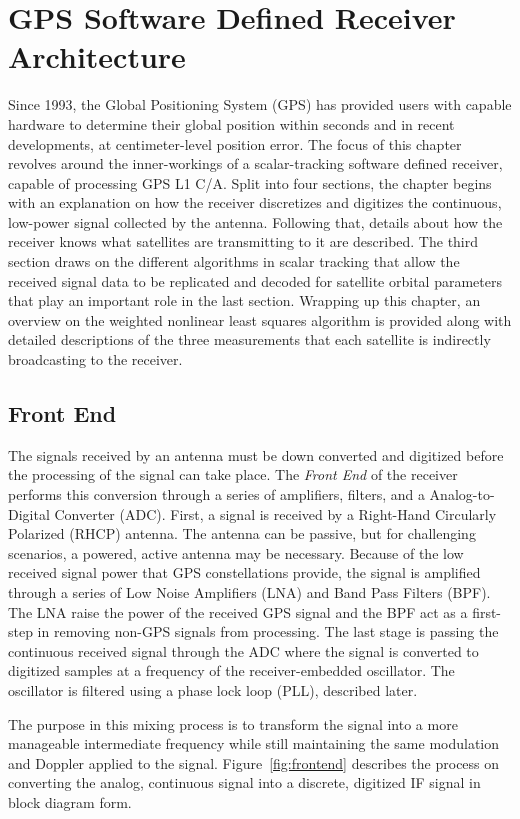 \chapter{GPS Software Defined Receiver Architecture}\label{chpater:scalartracking}
Since 1993, the Global Positioning System (GPS) has provided users with capable hardware to determine their global position within seconds and in recent developments, at centimeter-level position error. The focus of this chapter revolves around the inner-workings of a scalar-tracking software defined receiver, capable of processing GPS L1 C/A. Split into four sections, the chapter begins with an explanation on how the receiver discretizes and digitizes the continuous, low-power signal collected by the antenna. Following that, details about how the receiver knows what satellites are transmitting to it are described. The third section draws on the different algorithms in scalar tracking that allow the received signal data to be replicated and decoded for satellite orbital parameters that play an important role in the last section. Wrapping up this chapter, an overview on the weighted nonlinear least squares algorithm is provided along with detailed descriptions of the three measurements that each satellite is indirectly broadcasting to the receiver.

\section{Front End}
The signals received by an antenna must be down converted and digitized before the processing of the signal can take place. The \textit{Front End} of the receiver performs this conversion through a series of amplifiers, filters, and a Analog-to-Digital Converter (ADC). First, a signal is received by a Right-Hand Circularly Polarized (RHCP) antenna. The antenna can be passive, but for challenging scenarios, a powered, active antenna may be necessary. Because of the low received signal power that GPS constellations provide, the signal is amplified through a series of Low Noise Amplifiers (LNA) and Band Pass Filters (BPF). The LNA raise the power of the received GPS signal and the BPF act as a first-step in removing non-GPS signals from processing. The last stage is passing the continuous received signal through the ADC where the signal is converted to digitized samples at a frequency of the receiver-embedded oscillator. The oscillator is filtered using a phase lock loop (PLL), described later.

The purpose in this mixing process is to transform the signal into a more manageable intermediate frequency while still maintaining the same modulation and Doppler applied to the signal. Figure~\ref{fig:frontend} describes the process on converting the analog, continuous signal into a discrete, digitized IF signal in block diagram form.

